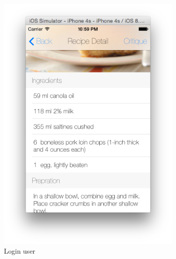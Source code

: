 \begin{figure}[h]
\begin{subfigure}{.32\textwidth}
	  		\includegraphics[width=.9\linewidth]{figures/ch4_app_screen_shots/recipe_detail/recipe_detail_2.png}
	  		\caption{Login user}
	  	\end{subfigure}
	  	\begin{subfigure}{.32\textwidth}

\end{subfigure}
\end{figure}

